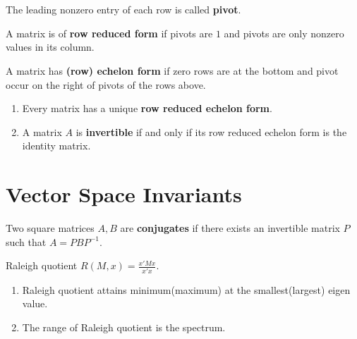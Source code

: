 \section{}
\begin{definition}
	The leading nonzero entry of each row is called \textbf{pivot}.
\end{definition}
\begin{definition}
	A matrix is of \textbf{row reduced form} if pivots are $1$ and pivots are only nonzero values in its column.
\end{definition}
\begin{definition}
	A matrix has \textbf{(row) echelon form} if zero rows are at the bottom and pivot occur on the right of pivots of the rows above.
\end{definition}
\begin{enumerate}
	\item Every matrix has a unique \textbf{row reduced echelon form}.
	\item A matrix $A$ is \textbf{invertible} if and only if its row reduced echelon form is the identity matrix.
\end{enumerate}
\section{Vector Space Invariants}
\begin{definition}[conjugation]
	Two square matrices $A,B$ are \textbf{conjugates} if there exists an invertible matrix $P$ such that $A = PBP^{-1}$.
\end{definition}

\begin{definition}
	Raleigh quotient $R(M,x) = \frac{x'Mx}{x'x}$.
\end{definition}
\begin{enumerate}	
	\item Raleigh quotient attains minimum(maximum) at the smallest(largest) eigen value.
	\item The range of Raleigh quotient is the spectrum. 
\end{enumerate}	

